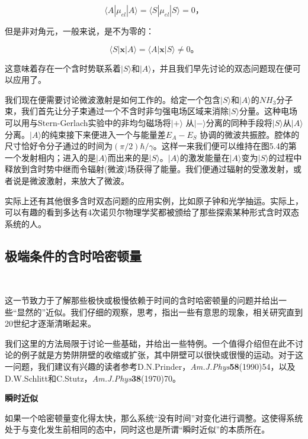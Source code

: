 ﻿\documentclass[UTF8,twoside]{ctexart}
\begin{document}
\begin{equation} \label{5.5.38}
\langle A|\mu_{e\!l}|A\rangle=\langle S|\mu_{e\!l}|S\rangle=0\text{，}
\end{equation}

\noindent 但是非对角元，一般来说，是不为零的：

\begin{equation} \label{5.5.39}
\langle S|\boldsymbol{x}|A\rangle=\langle A|\boldsymbol{x}|S\rangle\neq0\text{。}
\end{equation}

\noindent 这意味着存在一个含时势联系着$|S\rangle$和$|A\rangle$，并且我们早先讨论的双态问题现在便可以应用了。

我们现在便需要讨论微波激射是如何工作的。给定一个包含$|S\rangle$和$|A\rangle$的$NH_3$分子束，我们首先让分子束通过一个不含时非匀强电场区域来消除$|S\rangle$分量。这种电场可以用与Stern-Gerlach实验中的非均匀磁场将$|+\rangle$ 从$|-\rangle$分离的同种手段将$|S\rangle$从$|A\rangle$分离。$|A\rangle$的纯束接下来便进入一个与能量差$E_A-E_S$ 协调的微波共振腔。腔体的尺寸恰好令分子通过的时间为$(\pi/2)\hbar/\gamma$。这样一来我们便可以维持在图5.4的第一个发射相内；进入的是$|A\rangle$而出来的是$|S\rangle$。$|A\rangle$的激发能量在$|A\rangle$变为$|S\rangle$的过程中释放到含时势中继而令辐射(微波)场获得了能量。我们便通过辐射的受激发射，或者说是微波激射，来放大了微波。

实际上还有其他很多含时双态问题的应用实例，比如原子钟和光学抽运。实际上，可以有趣的看到多达有4次诺贝尔物理学奖都被颁给了那些探索某种形式含时双态系统的人。

\subsection{极端条件的含时哈密顿量}

\

\noindent 这一节致力于了解那些极快或极慢依赖于时间的含时哈密顿量的问题并给出一些“显然的”近似。我们仔细的观察，思考，指出一些有意思的现象，相关研究直到20世纪才逐渐清晰起来。

我们这里的方法局限于讨论一些基础，并给出一些特例。一个值得介绍但在此不讨论的例子就是方势阱阱壁的收缩或扩张，其中阱壁可以很快或很慢的运动。对于这一问题，我们建议有兴趣的读者参考D.N.Prinder，\emph{Am.J.Phys}\phantom{.}\textbf{58}(1990)54，以及D.W.Schlitt和C.Stutz，\emph{Am.J.Phys}\phantom{.}\textbf{38}(1970)70。

\noindent \textbf{瞬时近似}

\noindent 如果一个哈密顿量变化得太快，那么系统“没有时间”对变化进行调整。这使得系统处于与变化发生前相同的态中，同时这也是所谓“瞬时近似”的本质所在。
\end{document}
